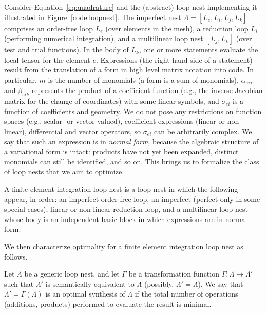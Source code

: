 Consider Equation~\ref{eq:quadrature} and the (abstract) loop nest implementing it illustrated in Figure~\ref{code:loopnest}. The imperfect nest $\Lambda=[L_e, L_i, L_j, L_k]$ comprises an order-free loop $L_e$ (over elements in the mesh), a reduction loop $L_i$ (performing numerical integration), and a multilinear loop nest $[L_j, L_k]$ (over test and trial functions). In the body of $L_k$, one or more statements evaluate the local tensor for the element $e$. Expressions (the right hand side of a statement) result from the translation of a form in high level matrix notation into code. In particular, $m$ is the number of monomials (a form is a sum of monomials), $\alpha_{eij}$ and $\beta_{eik}$ represents the product of a coefficient function (e.g., the inverse Jacobian matrix for the change of coordinates) with some linear symbols, and $\sigma_{ei}$ is a function of coefficients and geometry. We do not pose any restrictions on function spaces (e.g., scalar- or vector-valued), coefficient expressions (linear or non-linear), differential and vector operators, so $\sigma_{ei}$ can be arbitrarily complex. We say that such an expression is in \textit{normal form}, because the algebraic structure of a variational form is intact: products have not yet been expanded, distinct monomials can still be identified, and so on. This brings us to formalize the class of loop nests that we aim to optimize.


\begin{Def}
\label{def:fem-loopnest}
A finite element integration loop nest is a loop nest in which the following appear, in order: an imperfect order-free loop, an imperfect (perfect only in some special cases), linear or non-linear reduction loop, and a multilinear loop nest whose body is an independent basic block in which expressions are in normal form.
\end{Def}

We then characterize optimality for a finite element integration loop nest as follows.

\begin{Def}
\label{def:mln-optimality}
Let $\Lambda$ be a generic loop nest, and let $\Gamma$ be a transformation function $\Gamma : \Lambda \rightarrow \Lambda'$ such that $\Lambda'$ is semantically equivalent to $\Lambda$ (possibly, $\Lambda' = \Lambda$). We say that $\Lambda' = \Gamma (\Lambda)$ is an optimal synthesis of $\Lambda$ if the total number of operations (additions, products) performed to evaluate the result is minimal.
\end{Def}

